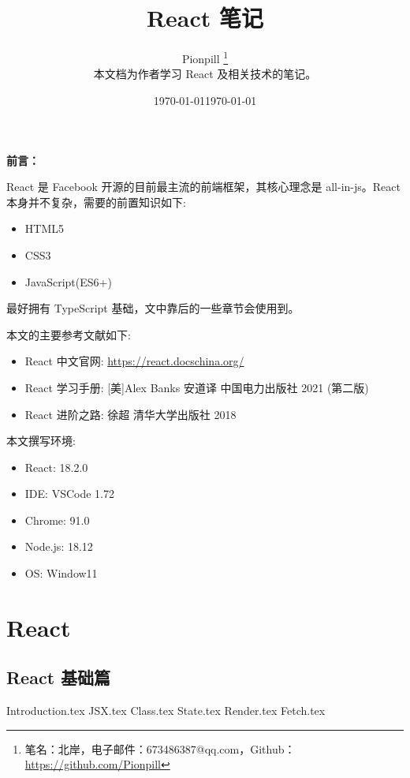 \documentclass{PionpillNote-book}
\title{React 笔记}
\author{
    Pionpill \footnote{笔名：北岸，电子邮件：673486387@qq.com，Github：\url{https://github.com/Pionpill}} \\
    本文档为作者学习 React 及相关技术的笔记。\\
}
\date{\today}
\begin{document}
\pagestyle{plain}
\maketitle

\noindent\textbf{前言：}

React 是 Facebook 开源的目前最主流的前端框架，其核心理念是 all-in-js。React 本身并不复杂，需要的前置知识如下:
\begin{itemize}
    \item HTML5
    \item CSS3
    \item JavaScript(ES6+)
\end{itemize}

最好拥有 TypeScript 基础，文中靠后的一些章节会使用到。

本文的主要参考文献如下:
\begin{itemize}
    \item React 中文官网: \url{https://react.docschina.org/}
    \item React 学习手册: [美]Alex Banks 安道译 中国电力出版社 2021 (第二版)
    \item React 进阶之路: 徐超 清华大学出版社 2018
\end{itemize}

本文撰写环境:

\begin{itemize}
    \item React: 18.2.0
    \item IDE: VSCode 1.72 
    \item Chrome: 91.0
    \item Node.js: 18.12
    \item OS: Window11
\end{itemize}

\date{\today}
\newpage

\tableofcontents

\newpage

\setcounter{page}{1} 
\pagestyle{fancy}

\part{React}
\chapter{React 基础篇}
{Introduction.tex}
{JSX.tex}
{Class.tex}
{State.tex}
{Render.tex}
{Fetch.tex}
\end{document}
